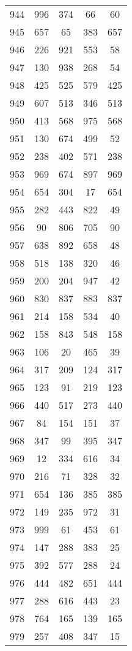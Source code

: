 \documentclass[a4paper,10pt,ngerman]{scrartcl}
\begin{document}
\begin{longtable}[c]{c|c|c|c|c}
    944 & 996 & 374 & 66 & 60 \\
    945 & 657 & 65 & 383 & 657 \\
    946 & 226 & 921 & 553 & 58 \\
    947 & 130 & 938 & 268 & 54 \\
    948 & 425 & 525 & 579 & 425 \\
    949 & 607 & 513 & 346 & 513 \\
    950 & 413 & 568 & 975 & 568 \\
    951 & 130 & 674 & 499 & 52 \\
    952 & 238 & 402 & 571 & 238 \\
    953 & 969 & 674 & 897 & 969 \\
    954 & 654 & 304 & 17 & 654 \\
    955 & 282 & 443 & 822 & 49 \\
    956 & 90 & 806 & 705 & 90 \\
    957 & 638 & 892 & 658 & 48 \\
    958 & 518 & 138 & 320 & 46 \\
    959 & 200 & 204 & 947 & 42 \\
    960 & 830 & 837 & 883 & 837 \\
    961 & 214 & 158 & 534 & 40 \\
    962 & 158 & 843 & 548 & 158 \\
    963 & 106 & 20 & 465 & 39 \\
    964 & 317 & 209 & 124 & 317 \\
    965 & 123 & 91 & 219 & 123 \\
    966 & 440 & 517 & 273 & 440 \\
    967 & 84 & 154 & 151 & 37 \\
    968 & 347 & 99 & 395 & 347 \\
    969 & 12 & 334 & 616 & 34 \\
    970 & 216 & 71 & 328 & 32 \\
    971 & 654 & 136 & 385 & 385 \\
    972 & 149 & 235 & 972 & 31 \\
    973 & 999 & 61 & 453 & 61 \\
    974 & 147 & 288 & 383 & 25 \\
    975 & 392 & 577 & 288 & 24 \\
    976 & 444 & 482 & 651 & 444 \\
    977 & 288 & 616 & 443 & 23 \\
    978 & 764 & 165 & 139 & 165 \\
    979 & 257 & 408 & 347 & 15 \\

\end{longtable}
\end{document}
